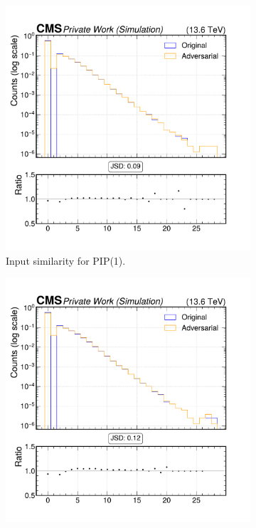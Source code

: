 \begin{figure}[h]
  \centering
  \begin{subfigure}[t]{0.32\textwidth}
    \includegraphics[width=\linewidth]{media/output/features/compare/intprob_1/cmp_global_features_TagVarCSV_jetNTracksEtaRel.pdf}
    \caption{Input similarity for PIP(1).}
  \end{subfigure}\hfill
  \begin{subfigure}[t]{0.32\textwidth}
    \includegraphics[width=\linewidth]{media/output/features/compare/intprob_2/cmp_global_features_TagVarCSV_jetNTracksEtaRel.pdf}

\end{subfigure}
\end{figure}
